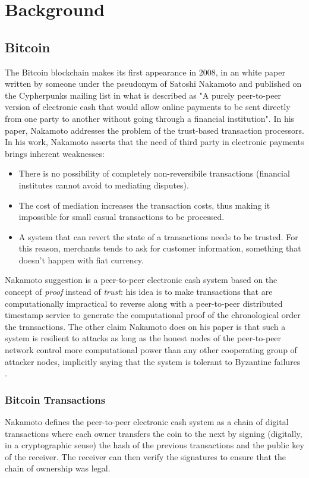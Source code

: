 
	\chapter{Background}
	
	\section{Bitcoin}
		The Bitcoin blockchain makes its first appearance in 2008, in an white paper written by someone under the pseudonym of Satoshi Nakamoto \cite{Nakamoto2008} and published on the Cypherpunks mailing list in what is described as "A purely peer-to-peer version of electronic cash that would allow online payments to be sent directly from one party to another without going through a financial institution". In his paper, Nakamoto addresses the problem of the trust-based transaction processors. In his work, Nakamoto asserts that the need of third party in electronic payments brings inherent weaknesses:
		\begin{itemize}
			\item There is no possibility of completely non-reversibile transactions (financial institutes cannot avoid to mediating disputes).
			\item The cost of mediation increases the transaction costs, thus making it impossible for small casual transactions to be processed.
			\item A system that can revert the state of a transactions needs to be trusted. For this reason, merchants tends to ask for customer information, something that doesn't happen with fiat currency.
		\end{itemize}
		Nakamoto suggestion is a peer-to-peer electronic cash system based on the concept of \textit{proof} instead of \textit{trust}: his idea is to make transactions that are computationally impractical to reverse along with a peer-to-peer distributed timestamp service to generate the computational proof of the chronological order the transactions. The other claim Nakamoto does on his paper is that such a system is resilient to attacks as long as the honest nodes of the peer-to-peer network control more computational power than any other cooperating group of attacker nodes, implicitly saying that the system is tolerant to Byzantine failures \cite{Lamport1982}.
		
	\subsection{Bitcoin Transactions}
		Nakamoto defines the peer-to-peer electronic cash system as a chain of digital transactions where each owner transfers the coin to the next by signing (digitally, in a cryptographic sense) the hash of the previous transactions and the public key of the receiver. The receiver can then verify the signatures to ensure that the chain of ownership was legal. 
		
